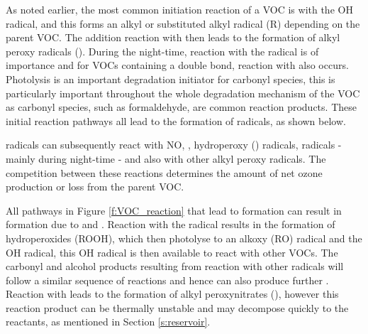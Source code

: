 As noted earlier, the most common initiation reaction of a VOC is with the OH radical, and this forms an alkyl or substituted 
alkyl radical (R) depending on the parent VOC. The addition reaction with  then leads to the formation of alkyl peroxy 
radicals (). During the night-time, reaction with the  radical is of importance and for VOCs containing a 
double bond, reaction with  also occurs. Photolysis is an important degradation initiator for carbonyl species, this is 
particularly important throughout the whole degradation mechanism of the VOC as carbonyl species, such as formaldehyde, are 
common reaction products. These initial reaction pathways all lead to the formation of  radicals, as shown below.
\begin{reactionlist}
\end{reactionlist} 
 radicals can subsequently react with NO, , hydroperoxy () radicals,  radicals - mainly during 
night-time - and also with other alkyl peroxy radicals. The competition between these reactions determines the amount of net 
ozone production or loss from the parent VOC. 
\begin{reactionlist}
\end{reactionlist}
All pathways in Figure \ref{f:VOC_reaction} that lead to  formation can result in  formation due to 
 and . Reaction with the  radical results in the formation of 
hydroperoxides (ROOH), which then photolyse to an alkoxy (RO) radical and the OH radical, this OH radical is then available to 
react with other VOCs. The carbonyl and alcohol products resulting from reaction with other  radicals will follow a 
similar sequence of reactions and hence can also produce further . Reaction with  leads to the formation of 
alkyl peroxynitrates (), however this reaction product can be thermally unstable and may decompose quickly to the 
reactants, as mentioned in Section \ref{s:reservoir}.


